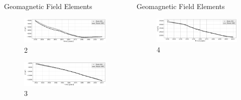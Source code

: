 \documentclass[final,t]{beamer}
\begin{document}
\begin{columns}[t]
\begin{column}{.66\linewidth}
\begin{columns}
\begin{column}{.31\linewidth}
\begin{block}{Geomagnetic Field Elements}
\begin{figure}
\centering
\includegraphics[scale=0.5]{"figs_ed/Y mean all_v3"}
\caption{2}

\label{fig:Ymeanall_v2}
\end{figure}

\begin{figure}
	\centering
	\includegraphics[scale=0.5]{"figs_ed/Z mean all_v3"}
	\caption{3}
	\label{fig:Zmeanall_v2}
\end{figure}

\end{block}

\end{column}

\begin{column}{.31\linewidth}

\begin{block}{Geomagnetic Field Elements}
	


\begin{figure}
\centering
\includegraphics[scale=0.5]{"figs_ed/F mean all_v3"}
\caption{4}
\label{fig:Fmeanall_v2}
\end{figure}


\end{block}
\end{column}
\end{columns}
\end{column}
\end{columns}
\end{document}
